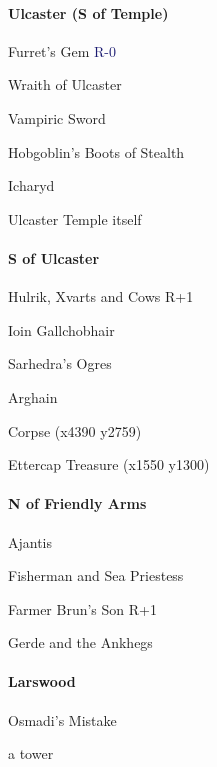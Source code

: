 \documentclass[10pt,a4,twoside]{book}
\begin{document}
\begin{multicols}{3}
\paragraph*{Ulcaster (S of Temple)}
\begin{trivlist}
\item Furret's Gem \textcolor{MidnightBlue}{R-0}
\item Wraith of Ulcaster
\item Vampiric Sword
\item Hobgoblin's Boots of Stealth
\item Icharyd

\item Ulcaster Temple itself
\end{trivlist}

\paragraph*{S of Ulcaster}
\begin{trivlist}
\item Hulrik, Xvarts and Cows {\textcolor{OliveGreen}{R+1}}
\item Ioin Gallchobhair
\item Sarhedra's Ogres
\item Arghain
\item Corpse (x4390 y2759)
\item Ettercap Treasure (x1550 y1300)
\end{trivlist}

\paragraph*{N of Friendly Arms}
\begin{trivlist}
\item Ajantis
\item Fisherman and Sea Priestess
\item Farmer Brun's Son {\textcolor{OliveGreen}{R+1}}
\item Gerde and the Ankhegs
\end{trivlist}

\paragraph*{Larswood}
\begin{trivlist}
\item Osmadi's Mistake
\item a tower
\end{trivlist}


\end{multicols}
\end{document}
